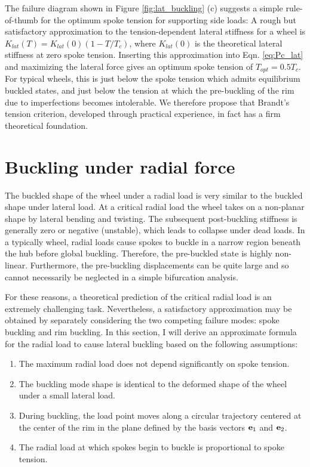 \documentclass[\rootdir/thesis.tex]{subfiles}
\begin{document}
The failure diagram shown in Figure \ref{fig:lat_buckling} (c) suggests a simple rule-of-thumb for the optimum spoke tension for supporting side loads: A rough but satisfactory approximation to the tension-dependent lateral stiffness for a wheel is $K_{lat} (T)=K_{lat} (0)(1-T/T_c)$, where $K_{lat} (0)$ is the theoretical lateral stiffness at zero spoke tension. Inserting this approximation into Eqn. \eqref{eq:Pc_lat} and maximizing the lateral force gives an optimum spoke tension of $T_{opt} = 0.5 T_c$. For typical wheels, this is just below the spoke tension which admits equilibrium buckled states, and just below the tension at which the pre-buckling of the rim due to imperfections becomes intolerable. We therefore propose that Brandt’s tension criterion, developed through practical experience, in fact has a firm theoretical foundation.


\section{Buckling under radial force}

The buckled shape of the wheel under a radial load is very similar to the buckled shape under lateral load. At a critical radial load the wheel takes on a non-planar shape by lateral bending and twisting. The subsequent post-buckling stiffness is generally zero or negative (unstable), which leads to collapse under dead loads. In a typically wheel, radial loads cause spokes to buckle in a narrow region beneath the hub before global buckling. Therefore, the pre-buckled state is highly non-linear. Furthermore, the pre-buckling displacements can be quite large and so cannot necessarily be neglected in a simple bifurcation analysis.

For these reasons, a theoretical prediction of the critical radial load is an extremely challenging task. Nevertheless, a satisfactory approximation may be obtained by separately considering the two competing failure modes: spoke buckling and rim buckling. In this section, I will derive an approximate formula for the radial load to cause lateral buckling based on the following assumptions:

\begin{enumerate}
\item{The maximum radial load does not depend significantly on spoke tension.}
\item{The buckling mode shape is identical to the deformed shape of the wheel under a small lateral load.}
\item{During buckling, the load point moves along a circular trajectory centered at the center of the rim in the plane defined by the basis vectors $\mathbf{e}_1$ and $\mathbf{e}_2$.}
\item{The radial load at which spokes begin to buckle is proportional to spoke tension.}
\end{enumerate}
\end{document}
